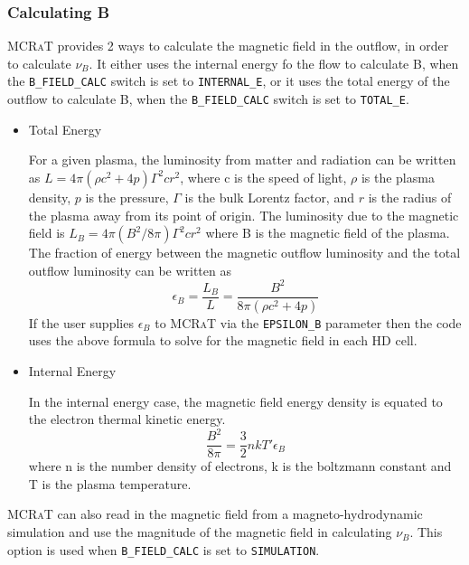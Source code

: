 \documentclass[12pt,a4paper]{article}
\newcommand{\mcrat}{\textsc{MCRaT}}
\begin{document}
\subsubsection{Calculating B}
\mcrat{} provides 2 ways to calculate the magnetic field in the outflow, in order to calculate $\nu_B$. It either uses the internal energy fo the flow to calculate B, when the \texttt{B\_FIELD\_CALC} switch is set to \texttt{INTERNAL\_E}, or it uses the total energy of the outflow to calculate B, when the \texttt{B\_FIELD\_CALC} switch is set to \texttt{TOTAL\_E}.
\begin{itemize}
\item Total Energy

For a given plasma, the luminosity from matter and radiation can be written as $L=4\pi(\rho c^2+4p)\Gamma^2cr^2$, where c is the speed of light, $\rho$ is the plasma density, $p$ is the pressure, $\Gamma$ is the bulk Lorentz factor, and $r$ is the radius of the plasma away from its point of origin. The luminosity due to the magnetic field is $L_B=4\pi(B^2/8\pi)\Gamma^2cr^2$ where B is the magnetic field of the plasma. The fraction of energy between the magnetic outflow luminosity and the total outflow luminosity can be written as
\begin{equation}
\epsilon_{B}=\frac{L_B}{L}=\frac{B^2}{8\pi(\rho c^2+4p)}
\end{equation}
If the user supplies $\epsilon_{B}$ to \mcrat{} via the \texttt{EPSILON\_B} parameter then the code uses the above formula to solve for the magnetic field in each HD cell.

\item Internal Energy

In the internal energy case, the magnetic field energy density is equated to the electron thermal kinetic energy.
\begin{equation}
\frac{B^2}{8\pi}=\frac{3}{2}nkT'\epsilon_{B}
\end{equation}
where n is the number density of electrons, k is the boltzmann constant and T is the plasma temperature.
\end{itemize}

\mcrat{} can also read in the magnetic field from a magneto-hydrodynamic simulation and use the magnitude of the magnetic field in calculating $\nu_B$. This option is used when \texttt{B\_FIELD\_CALC} is set to \texttt{SIMULATION}.
\end{document}
